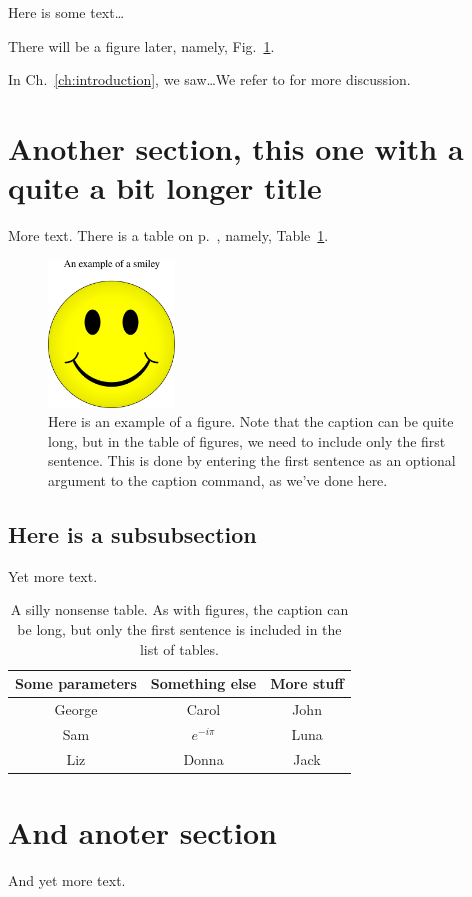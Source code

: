 \documentclass{UMassThesis14}
\begin{document}
Here is some text\ldots

\label{ch:second_chapter}

There will be a figure later, namely, Fig.~\ref{fig:myfig}.

In Ch.~\ref{ch:introduction}, we saw\ldots We refer to \cite{cooper1988_1} for more discussion.

\section{Another section, this one with a quite a bit longer title}
\label{sec:section_another_example}

More text. There is a table on p.~\pageref{tabl:mytable}, namely, Table~\ref{tabl:mytable}.

\begin{figure}[h!]
    \centering
    \includegraphics[width=0.3\textwidth]{smiley_figure}
    \caption[Here is an example of a figure.]{Here is an example of a figure. Note that the caption can be quite long, but in the table of figures, we need to include only the first sentence. This is done by entering the first sentence as an optional argument to the caption command, as we've done here.}
    \label{fig:myfig}
\end{figure}


\subsection{Here is a subsubsection}
\label{subsec:subsection_example}
Yet more text.

\begin{table}
\centering
\begin{tabular}{|c|c|c|}
\hline
Some parameters & Something else & More stuff \\ \hline
George & Carol & John \\ 
Sam & $e^{-i \pi}$ & Luna \\
 Liz & Donna & Jack \\
 \hline
\end{tabular}
 \caption[A silly nonsense table.]{A silly nonsense table. As with figures, the caption can be long, but only the first sentence is included in the list of tables.}
 \label{tabl:mytable}
\end{table}

\section{And anoter section}
\label{sec:further_section}
And yet more text.


\SetUpBibliography

\end{document}
